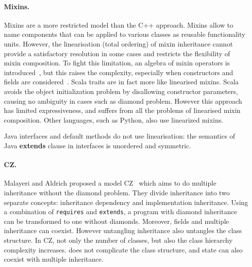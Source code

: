 \paragraph{Mixins.}
Mixins are a more restricted model than the C++ approach. Mixins allow to name
components that can be applied to various classes as reusable functionality
units. However, %
the linearisation (total ordering) of
mixin inheritance cannot provide a satisfactory resolution in some cases and
restricts the flexibility of mixin composition. To fight this limitation, an
algebra of mixin operators is introduced~\cite{ancona2002calculus}, but this
raises the complexity, especially when constructors and fields
are considered~\cite{marco09FJigsaw}. Scala traits are in fact more like linearised mixins.
Scala avoids the object initialization
problem by disallowing constructor parameters, causing no ambiguity in cases
such as diamond problem. However this approach has limited expressiveness, and
suffers from all the problems of linearised mixin composition. Other languages, such as 
Python, also use linearized mixins.
\begin{comment}
Python also offers multiple inheritance via linearised mixins. Indeed in python any class is implicitly a mixin, and mixin composition informally expressed as\\*
\Q@ class A use B,C {...new methods...}@\\*
can be expressed in python as \\*
\Q@ class Aux: ...new methods...@\\*
\Q@ class A(B,C,Aux): pass@ 
\end{comment}
\noindent Java interfaces and default methods do not use
linearisation: the semantics of Java \textbf{extends} clause in
interfaces is unordered and symmetric.


\paragraph{CZ.}
Malayeri and Aldrich proposed a model CZ~\cite{malayeri2009cz} which
aims to do multiple inheritance without the diamond problem. They
divide inheritance into two separate concepts: inheritance dependency
and implementation inheritance. Using a combination of
\texttt{requires} and \texttt{extends}, a program with diamond
inheritance can be transformed to one without diamonds. Moreover,
fields and multiple inheritance can coexist. However untangling
inheritance also untangles the class structure. In CZ, not only the
number of classes, but also the class hierarchy complexity
increases. \mixin does not complicate the class structure, and state
can also coexist with multiple inheritance.

